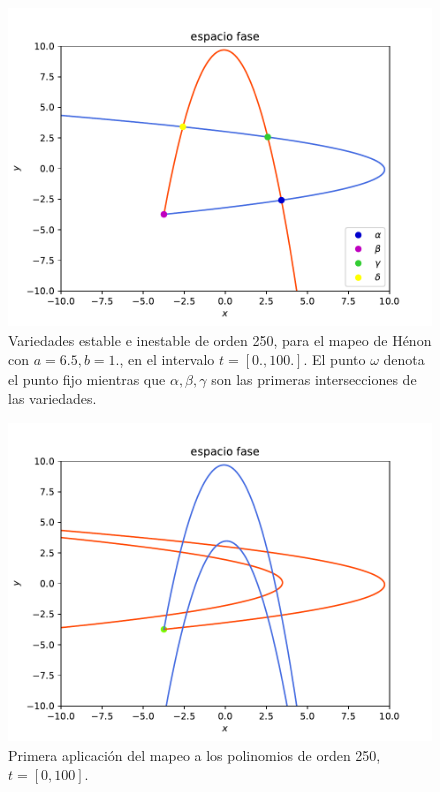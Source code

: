 \documentclass[11pt]{beamer}
\theoremstyle{definition}
\begin{document}
\begin{frame}
\begin{figure}[H]
	\centering
	\includegraphics[scale=0.5]{rectangulo_fundamental}
	\caption{Variedades estable e inestable de orden 250, para el mapeo de Hénon con $a=6.5,b=1.$, en el intervalo $t=[0.,100.]$. El punto $\omega$ denota el punto fijo mientras que $\alpha, \beta, \gamma$ son las primeras intersecciones de las variedades.}
	\label{rectangulo0}
\end{figure}
\end{frame}
\begin{frame}
\begin{figure}[H]
	\centering
	\includegraphics[scale=0.5]{rectangulo1.pdf}
	\caption{Primera aplicación del mapeo a los polinomios de orden 250, $t=[0,100]$.}
	\label{Rectangulo1}
\end{figure}
\end{frame}
\end{document}
